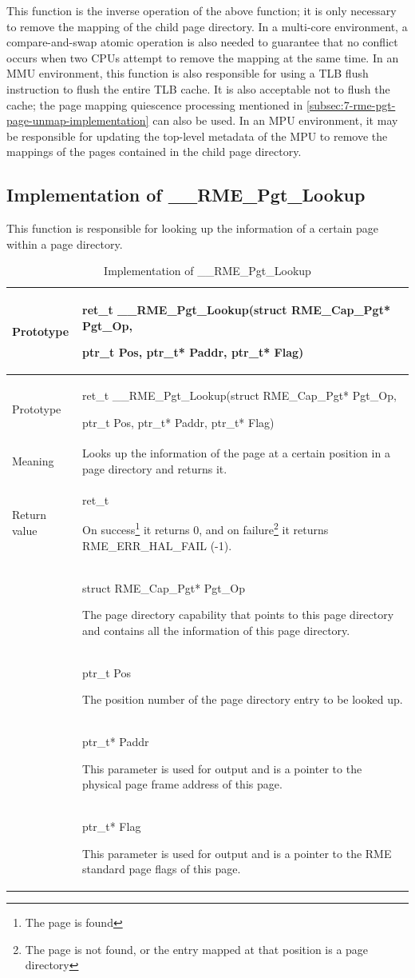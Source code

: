 This function is the inverse operation of the above function; it is only necessary to remove the mapping of the child page directory. In a multi-core environment, a compare-and-swap atomic operation is also needed to guarantee that no conflict occurs when two CPUs attempt to remove the mapping at the same time. In an MMU environment, this function is also responsible for using a TLB flush instruction to flush the entire TLB cache. It is also acceptable not to flush the cache; the page mapping quiescence processing mentioned in \ref{subsec:7-rme-pgt-page-unmap-implementation}
can also be used. In an MPU environment, it may be responsible for updating the top-level metadata of the MPU to remove the mappings of the pages contained in the child page directory.

\subsection{Implementation of \_\_RME\_Pgt\_Lookup}\label{subsec:7-rme-pgt-lookup-implementation}

This function is responsible for looking up the information of a certain page within a page directory.

\begin{xltabular}{\textwidth}{@{}>{\hsize\raggedright\arraybackslash}X>{\hsize\raggedright\arraybackslash}X@{}}
\caption{Implementation of \_\_RME\_Pgt\_Lookup}\label{tab:7-83-rme-pgt-lookup-implementation}\\
\toprule
Prototype\strut
 & ret\_t \_\_RME\_Pgt\_Lookup(struct RME\_Cap\_Pgt* Pgt\_Op,

ptr\_t Pos, ptr\_t* Paddr, ptr\_t* Flag)\strut
\tabularnewline
\endfirsthead
\toprule
Prototype\strut
 & ret\_t \_\_RME\_Pgt\_Lookup(struct RME\_Cap\_Pgt* Pgt\_Op,

ptr\_t Pos, ptr\_t* Paddr, ptr\_t* Flag)\strut
\tabularnewline
\midrule
\endhead
\bottomrule
\endlastfoot
Meaning & Looks up the information of the page at a certain position in a page directory and returns it.\tabularnewline
Return value\strut
 & ret\_t

On success\footnote{The page is found} it returns 0, and on failure\footnote{The page is not found, or the entry mapped at that position is a page directory} it returns RME\_ERR\_HAL\_FAIL (-1).\strut
\tabularnewline
{} & struct RME\_Cap\_Pgt* Pgt\_Op

The page directory capability that points to this page directory and contains all the information of this page directory.\strut
\tabularnewline
\strut
 & ptr\_t Pos

The position number of the page directory entry to be looked up.\strut
\tabularnewline
\strut
 & ptr\_t* Paddr

This parameter is used for output and is a pointer to the physical page frame address of this page.\strut
\tabularnewline
\strut
 & ptr\_t* Flag

This parameter is used for output and is a pointer to the RME standard page flags of this page.\strut
\tabularnewline
\end{xltabular}
\nopagebreak[4]

